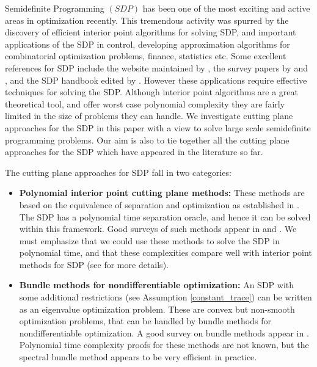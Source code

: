 \documentclass[12pt]{kluwer}
\begin{document}
\begin{article}
Semidefinite Programming $(SDP)$ has been one of the most exciting and active areas in optimization recently.
This tremendous activity was spurred by the discovery of efficient interior point algorithms for solving SDP,
and important applications of the SDP in control, developing approximation algorithms for combinatorial
optimization problems, finance, statistics etc.
Some excellent references for SDP include the website maintained by
, the survey papers by 
and  ,
and the SDP handbook edited by .
However these applications require effective techniques for solving the SDP.
Although interior point algorithms are a great theoretical tool, and offer worst case polynomial complexity
they are fairly limited in the size of problems they can handle. We investigate cutting plane approaches
for the SDP in this paper with a view to solve large scale semidefinite programming problems. 
Our aim is also to tie together all the cutting plane
approaches for the SDP which have appeared in the literature so far.

The cutting plane approaches for SDP fall in two categories:
\begin{itemize}
\item{\bf Polynomial interior point cutting plane methods:} These methods are based on the equivalence of
separation and optimization as established in . The SDP
has a polynomial time separation oracle, and hence it can be solved within this framework. Good
surveys of such methods appear in  and
. 
We must emphasize that we could use these
methods to solve the SDP in polynomial time, and that these complexities compare well with interior point methods
for SDP (see  for more details).
\item{\bf Bundle methods for nondifferentiable optimization:} An SDP with some additional restrictions
(see Assumption \ref{constant_trace}) can be written as an eigenvalue optimization problem. These are convex
but non-smooth optimization problems, that can be handled by bundle methods for nondifferentiable optimization.
A good survey on bundle methods appear in . Polynomial time complexity proofs for 
these methods are not known, but the spectral bundle method \cite{helmberg_rendl} appears to be very efficient
in practice.
\end{itemize}


\end{article}
\end{document}
